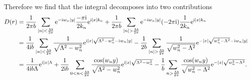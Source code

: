 \documentclass[english, parskip=full]{scrartcl}
\begin{document}
Therefore we find that the integral decomposes into two contributions
\begin{align}
D(r) &= \frac{1}{2\pi b} \sum_{|n|< \frac{\Lambda b}{2\pi}} \powe{-\i w_n |y|} \frac{-\pi\i}{2k_n} \powe{\i |x| k_n} + \frac{1}{2\pi b} \sum_{|n|> \frac{\Lambda b}{2\pi}} \powe{-\i w_n |y|} (-2\pi\i) \frac{1}{2k_n} \powe{\i |x| k_n}\\
&= \frac{1}{4\i b} \sum_{|n|<\frac{\Lambda b}{2\pi}} \frac{1}{\sqrt{\Lambda^2 - w_n^2}} \powe{\i |x|\sqrt{\Lambda^2 - w_n^2} - \i w_n |y|} - \frac{1}{2 b} \sum_{|n|> \frac{\Lambda b}{2\pi}} \frac{1}{\sqrt{w_n^2 - \Lambda^2}} \powe{-|x|\sqrt{w_n^2 - \Lambda^2} - \i w_n |y|}\\
&= \frac{1}{4\i b\Lambda} \powe{\i |x|\Lambda} + \frac{1}{2\i b} \sum_{0<n<\frac{\Lambda b}{2\pi}} \frac{\cos(w_n y)}{\sqrt{\Lambda^2 - w_n^2}} \powe{\i|x|\sqrt{\Lambda^2 - w_n^2}} - \frac{1}{b} \sum_{n> \frac{\Lambda b}{2\pi}} \frac{\cos(w_n y)}{\sqrt{w_n^2 - \Lambda^2}} \powe{-|x|\sqrt{w_n^2 - \Lambda^2}}.
\end{align}
\end{document}
